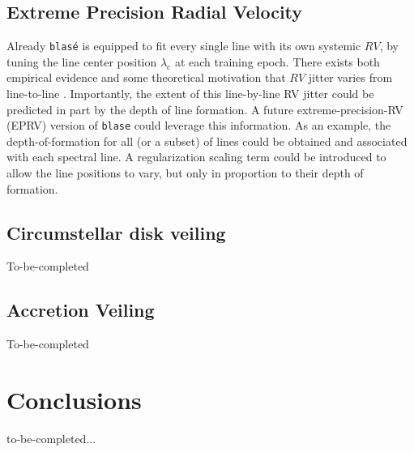 \documentclass[twocolumn]{aastex631}
\begin{document}
\subsection{Extreme Precision Radial Velocity}

Already \texttt{blas\'e} is equipped to fit every single line with its own systemic $RV$, by tuning the line center position $\lambda_\mathrm{c}$ at each training epoch.  There exists both empirical evidence and some theoretical motivation that $RV$ jitter varies from line-to-line \citep{2018A&A...620A..47D}.  Importantly, the extent of this line-by-line RV jitter could be predicted in part by the depth of line formation.  A future extreme-precision-RV (EPRV) version of \texttt{blase} could leverage this information.  As an example, the depth-of-formation for all (or a subset) of lines could be obtained and associated with each spectral line.  A regularization scaling term could be introduced to allow the line positions to vary, but only in proportion to their depth of formation.

\subsection{Circumstellar disk veiling}
To-be-completed

\subsection{Accretion Veiling}
To-be-completed




\section{Conclusions}
to-be-completed...
\end{document}
